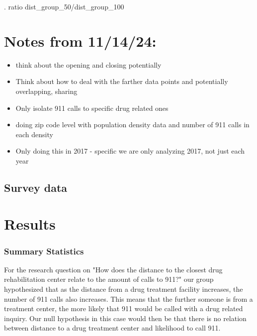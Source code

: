 \documentclass[12pt]{article}
\begin{document}
. ratio dist_group_50/dist_group_100


\section{Notes from 11/14/24:}
\begin{itemize}
    \item think about the opening and closing potentially
    \item Think about how to deal with the farther data points and potentially overlapping, sharing
    \item Only isolate 911 calls to specific drug related ones 
    \item doing zip code level with population density data and number of 911 calls in each density
    \item Only doing this in 2017 - specific we are only analyzing 2017, not just each year
    \end{itemize}
\subsection{Survey data}

\section{Results}
\label{sec:result}
\subsubsection{Summary Statistics}


For the research question on "How does the distance to the closest drug rehabilitation center relate to the amount of calls to 911?" our group hypothesized that as the distance from a drug treatment facility increases, the number of 911 calls also increases. This means that the further someone is from a treatment center, the more  likely that 911 would be called with a drug related inquiry. Our null hypothesis in this case would then be that there is no relation between distance to a drug treatment center and likelihood to call 911. 
\end{document}
